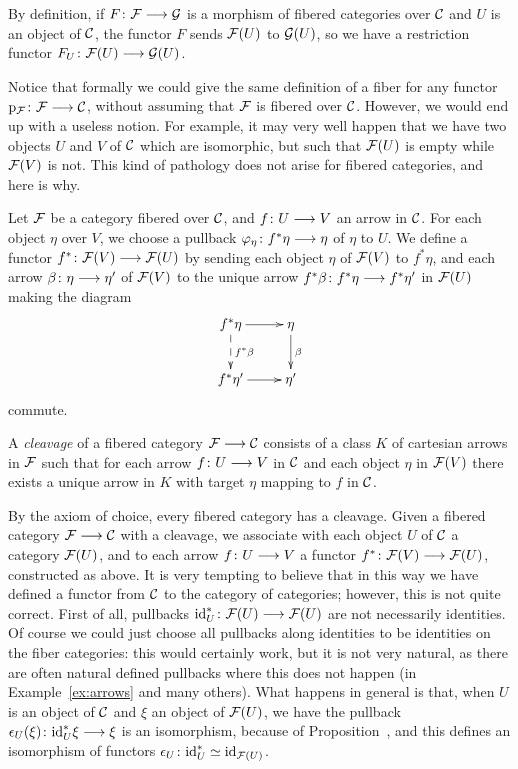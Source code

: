 \begin{3   FIBERED CATEGORIES}
\begin{3.1 Fibered categories}
By definition, if $F \colon \cF \arr \cG$ is a morphism of fibered categories over $\mathcal{C}$ and $U$ is an object of $\mathcal{C}$, the functor $F$ sends $\mathcal{F}(U)$ to $\mathcal{G}(U)$, so we have a restriction functor $F_U \colon \cF(U) \arr \cG(U)$.

Notice that formally we could give the same definition of a fiber for any functor $\p_{\cF} \colon \cF \arr \cC$, without assuming that $\mathcal{F}$ is fibered over $\mathcal{C}$. However, we would end up with a useless notion. For example, it may very well happen that we have two objects $U$ and $V$ of $\mathcal{C}$ which are isomorphic, but such that $\mathcal{F}(U)$ is empty while $\mathcal{F}(V)$ is not. This kind of pathology does not arise for fibered categories, and here is why.

Let $\mathcal{F}$ be a category fibered over $\mathcal{C}$, and $f \colon U \arr V$ an arrow in $\mathcal{C}$. For each object $\eta$ over $V$, we choose a pullback $\phi_\eta \colon f^*\eta \arr \eta$ of $\eta$ to $U$. We define a functor $f^* \colon \cF(V) \arr \cF(U)$ by sending each object $\eta$ of $\mathcal{F}(V)$ to $f^*\eta $, and each arrow $\beta\colon \eta \arr \eta'$ of $\mathcal{F}(V)$ to the unique arrow $f^*\beta \colon f^*\eta \arr f^*\eta'$ in $\mathcal{F}(U)$ making the diagram
   \[
   \xymatrix{
   f^* \eta\ar[r]\ar@{-->}[d]^{f^* \beta}
   &{}\eta\ar[d]^\beta\\
   f^* \eta'\ar[r]&{}\eta'\\}
   \] commute.

\begin{definition}
A \emph{cleavage}%
 of a fibered category $\cF \arr \cC$ consists of a class $K$ of cartesian arrows in $\mathcal{F}$ such that for each arrow $f \colon U \arr V$ in $\mathcal{C}$ and each object $\eta$ in $\mathcal{F}(V)$ there exists a unique arrow in $K$ with target $\eta$ mapping to $f$ in $\mathcal{C}$.
\end{definition}

By the axiom of choice, every fibered category has a cleavage. Given a fibered category $\cF \arr \cC$ with a cleavage, we associate with each object $U$ of $\mathcal{C}$ a category $\mathcal{F}(U)$, and to each arrow $f \colon U \arr V$ a functor $f^* \colon \cF(V) \arr \cF(U)$, constructed as above. It is very tempting to believe that in this way we have defined a functor from $\mathcal{C}$ to the category of categories; however, this is not quite correct. First of all, pullbacks $\id_U^* \colon \cF(U) \arr \cF(U)$ are not necessarily identities. Of course we could just choose all pullbacks along identities to be identities on the fiber categories: this would certainly work, but it is not very natural, as there are often natural defined pullbacks where this does not happen (in Example~\ref{ex:arrows} and many others). What happens in general is that, when $U$ is an object of $\mathcal{C}$ and $\xi$ an object of $\mathcal{F}(U)$, we have the pullback $\isoiden_U(\xi)\colon\id_U^* \xi \arr \xi$ is an isomorphism, because of Proposition~, and this defines an isomorphism  of functors $\epsilon_U\colon \mathrm{id}_U^* \simeq \mathrm{id}_{\mathcal{F}(U)}$.


\end{3.1 Fibered categories}
\end{3   FIBERED CATEGORIES}
